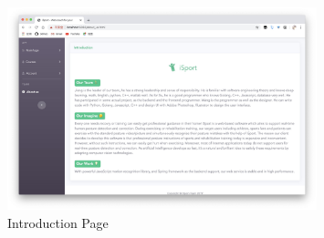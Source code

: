 \documentclass[16pt]{scrreprt}
\begin{document}
\begin{figure}[H]
	\centering
	\includegraphics[width=0.8\textwidth]{diagrams/about-us.jpg}
	\caption{Introduction Page}
\end{figure}
\end{document}
